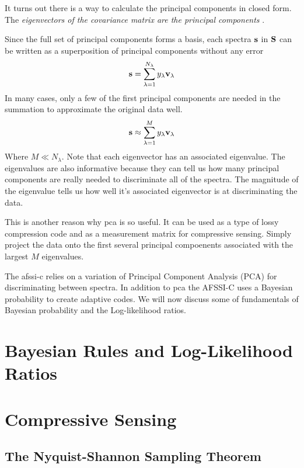 It turns out there is a way to calculate the principal components in closed form. The \emph{eigenvectors of the covariance matrix are the principal components} \cite{shlens2014tutorial}. 

Since the full set of principal components forms a basis, each spectra $\mathbf{s}$ in $\mathbf{S}$ can be written as a superposition of principal components without any error
\begin{equation}
\mathbf{s} = \sum_{\lambda = 1}^{N_{\lambda}} y_{\lambda} \mathbf{v}_{\lambda}
\end{equation}
In many cases, only a few of the first principal components are needed in the summation to approximate the original data well.
\begin{equation}
{\mathbf{s}} \approx \sum_{\lambda = 1}^{M} y_{\lambda} \mathbf{v}_{\lambda}
\end{equation}
Where $M \ll N_{\lambda} $. Note that each eigenvector has an associated eigenvalue. The eigenvalues are also informative because they can tell us how many principal components are really needed to discriminate all of the spectra. The magnitude of the eigenvalue tells us how well it's associated eigenvector is at discriminating the data.

This is another reason why \gls{pca} is so useful. It can be used as a type of lossy compression code and as a measurement matrix for compressive sensing. Simply project the data onto the first several principal compoenents associated with the largest $M$ eigenvalues. 

The \gls{afssi-c} relies on a variation of Principal Component Analysis (PCA) for discriminating between spectra. In addition to \gls{pca} the AFSSI-C uses a Bayesian probability to create adaptive codes. We will now discuss some of fundamentals of Bayesian probability and the Log-likelihood ratios. 

\section{Bayesian Rules and Log-Likelihood Ratios}

\section{Compressive Sensing}



\subsection{The Nyquist-Shannon Sampling Theorem}

